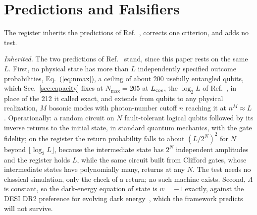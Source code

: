 \documentclass[aps,prd,twocolumn,superscriptaddress,nofootinbib]{revtex4-2}
\begin{document}
\section{Predictions and Falsifiers}
\label{sec:pred}

The register inherits the predictions of Ref.~\cite{korytko2026}, corrects one criterion, and adds no test.

\textit{Inherited.} The two predictions of Ref.~\cite{korytko2026} stand, since this paper rests on the same $L$. First, no physical state has more than $L$ independently specified outcome probabilities, Eq.~(\ref{eq:nmax}), a ceiling of about 200 usefully entangled qubits, which Sec.~\ref{sec:capacity} fixes at $N_{\max} = 205$ at $L_{\rm cos}$, the $\log_2 L$ of Ref.~\cite{korytko2026}, in place of the 212 it called exact, and extends from qubits to any physical realization, $M$ bosonic modes with photon-number cutoff $n$ reaching it at $n^M \approx L$. Operationally: a random circuit on $N$ fault-tolerant logical qubits followed by its inverse returns to the initial state, in standard quantum mechanics, with the gate fidelity; on the register the return probability falls to about $(L/2^N)^2$ for $N$ beyond $\lfloor\log_2 L\rfloor$, because the intermediate state has $2^N$ independent amplitudes and the register holds $L$, while the same circuit built from Clifford gates, whose intermediate states have polynomially many, returns at any $N$. The test needs no classical simulation, only the check of a return; no such machine exists. Second, $\Lambda$ is constant, so the dark-energy equation of state is $w = -1$ exactly, against the DESI DR2 preference for evolving dark energy~\cite{desi2025}, which the framework predicts will not survive.
\end{document}
